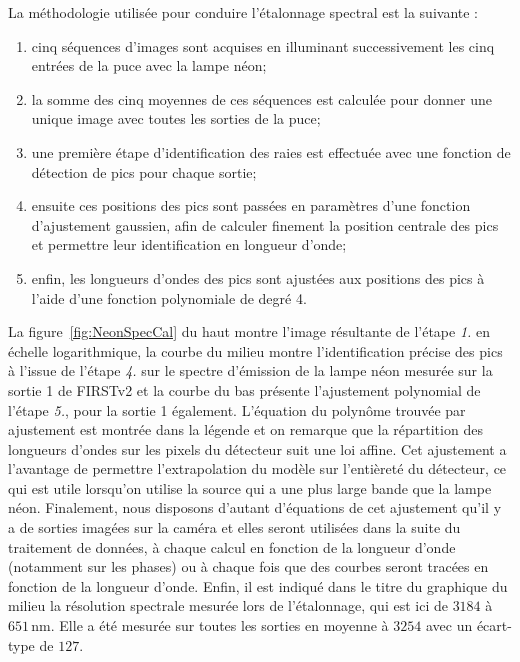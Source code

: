 La méthodologie utilisée pour conduire l'étalonnage spectral est la suivante :

\begin{enumerate}
    \item cinq séquences d'images sont acquises en illuminant successivement les cinq entrées de la puce avec la lampe néon;
    \item la somme des cinq moyennes de ces séquences est calculée pour donner une unique image avec toutes les sorties de la puce;
    \item une première étape d'identification des raies est effectuée avec une fonction de détection de pics pour chaque sortie;
    \item ensuite ces positions des pics sont passées en paramètres d'une fonction d'ajustement gaussien, afin de calculer finement la position centrale des pics et permettre leur identification en longueur d'onde;
    \item enfin, les longueurs d'ondes des pics sont ajustées aux positions des pics à l'aide d'une fonction polynomiale de degré 4.
\end{enumerate}

La figure~\ref{fig:NeonSpecCal} du haut montre l'image résultante de l'étape \textit{1.} en échelle logarithmique, la courbe du milieu montre l'identification précise des pics à l'issue de l'étape \textit{4.} sur le spectre d'émission de la lampe néon mesurée sur la sortie 1 de \ac{FIRSTv2} et la courbe du bas présente l'ajustement polynomial de l'étape \textit{5.}, pour la sortie 1 également. L'équation du polynôme trouvée par ajustement est montrée dans la légende et on remarque que la répartition des longueurs d'ondes sur les pixels du détecteur suit une loi affine. Cet ajustement a l'avantage de permettre l'extrapolation du modèle sur l'entièreté du détecteur, ce qui est utile lorsqu'on utilise la source \sk qui a une plus large bande que la lampe néon. Finalement, nous disposons d'autant d'équations de cet ajustement qu'il y a de sorties imagées sur la caméra et elles seront utilisées dans la suite du traitement de données, à chaque calcul en fonction de la longueur d'onde (notamment sur les phases) ou à chaque fois que des courbes seront tracées en fonction de la longueur d'onde. Enfin, il est indiqué dans le titre du graphique du milieu la résolution spectrale mesurée lors de l'étalonnage, qui est ici de $3184$ à $651 \,$nm. Elle a été mesurée sur toutes les sorties en moyenne à $3254$ avec un écart-type de $127$.

